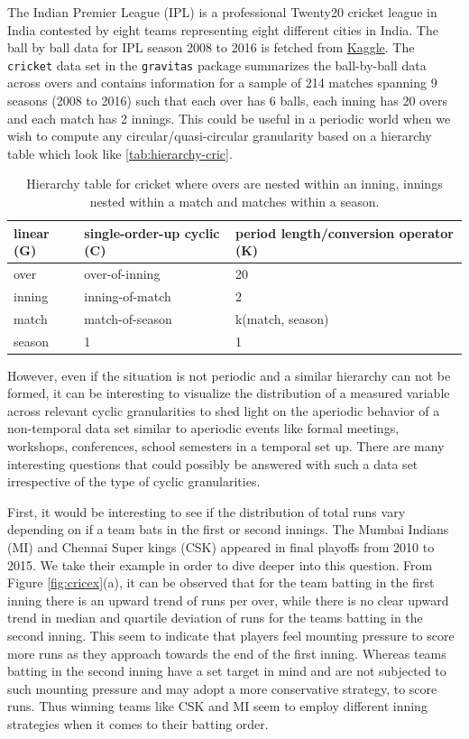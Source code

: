 \documentclass[
]{article}
\begin{document}
The Indian Premier League (IPL) is a professional Twenty20 cricket league in India contested by eight teams representing eight different cities in India. The ball by ball data for IPL season 2008 to 2016 is fetched from \href{https://www.kaggle.com/josephgpinto/ipl-data-analysis/data}{Kaggle}. The \texttt{cricket} data set in the \texttt{gravitas} package summarizes the ball-by-ball data across overs and contains information for a sample of 214 matches spanning 9 seasons (2008 to 2016) such that each over has 6 balls, each inning has 20 overs and each match has 2 innings. This could be useful in a periodic world when we wish to compute any circular/quasi-circular granularity based on a hierarchy table which look like \autoref{tab:hierarchy-cric}.

\begin{table}

\caption{\label{tab:hierarchy-cric}Hierarchy table for cricket where overs are nested within an inning, innings nested within a match and matches within a season.}
\centering
\begin{tabular}[t]{lll}
\toprule
linear (G) & single-order-up cyclic (C) & period length/conversion operator (K)\\
\midrule
over & over-of-inning & 20\\
inning & inning-of-match & 2\\
match & match-of-season & k(match, season)\\
season & 1 & 1\\
\bottomrule
\end{tabular}
\end{table}

However, even if the situation is not periodic and a similar hierarchy can not be formed, it can be interesting to visualize the distribution of a measured variable across relevant cyclic granularities to shed light on the aperiodic behavior of a non-temporal data set similar to aperiodic events like formal meetings, workshops, conferences, school semesters in a temporal set up. There are many interesting questions that could possibly be answered with such a data set irrespective of the type of cyclic granularities.

First, it would be interesting to see if the distribution of total runs vary depending on if a team bats in the first or second innings. The Mumbai Indians (MI) and Chennai Super kings (CSK) appeared in final playoffs from 2010 to 2015. We take their example in order to dive deeper into this question. From Figure \ref{fig:cricex}(a), it can be observed that for the team batting in the first inning there is an upward trend of runs per over, while there is no clear upward trend in median and quartile deviation of runs for the teams batting in the second inning. This seem to indicate that players feel mounting pressure to score more runs as they approach towards the end of the first inning. Whereas teams batting in the second inning have a set target in mind and are not subjected to such mounting pressure and may adopt a more conservative strategy, to score runs. Thus winning teams like CSK and MI seem to employ different inning strategies when it comes to their batting order.
\end{document}
